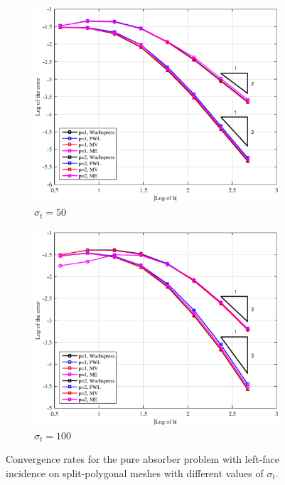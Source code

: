 \begin{figure}
{\begin{subfigure}[b]{0.485\textwidth}
	\end{subfigure}
}
\vspace{1cm}
{
	\begin{subfigure}[b]{0.485\textwidth}
		\centering
		\label{subfig::PA_Left_SplitPoly_sig50}
		\includegraphics[width=\textwidth]{figures/sec_BF/PAErr_Left_SplitPoly_sig50.eps}
	\caption{$\sigma_t = 50$}
	\end{subfigure}
	\hfill
	\begin{subfigure}[b]{0.485\textwidth}
		\centering
		\label{subfig::PA_Left_SplitPoly_sig100}
		\includegraphics[width=\textwidth]{figures/sec_BF/PAErr_Left_SplitPoly_sig100.eps}
	\caption{$\sigma_t = 100$}
	\end{subfigure}
}
\caption{Convergence rates for the pure absorber problem with left-face incidence on split-polygonal meshes with different values of $\sigma_t$.}
\label{fig::BF_Results_PA_Left_SplitPoly}
\end{figure}

